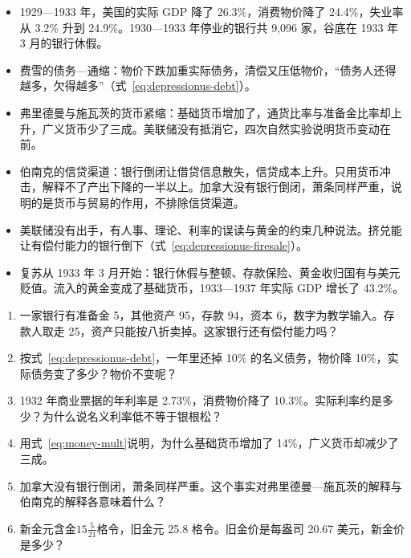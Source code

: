 \begin{takeaways}
\begin{itemize}
\item 1929—1933 年，美国的实际 GDP 降了 26.3\%，消费物价降了 24.4\%，失业率从 3.2\% 升到 24.9\%。1930—1933 年停业的银行共 9,096 家，谷底在 1933 年 3 月的银行休假。
\item 费雪的债务—通缩：物价下跌加重实际债务，清偿又压低物价，“债务人还得越多，欠得越多”（式~\eqref{eq:depressionus-debt}）。
\item 弗里德曼与施瓦茨的货币紧缩：基础货币增加了，通货比率与准备金比率却上升，广义货币少了三成。美联储没有抵消它，四次自然实验说明货币变动在前。
\item 伯南克的信贷渠道：银行倒闭让借贷信息散失，信贷成本上升。只用货币冲击，解释不了产出下降的一半以上。加拿大没有银行倒闭，萧条同样严重，说明的是货币与贸易的作用，不排除信贷渠道。
\item 美联储没有出手，有人事、理论、利率的误读与黄金的约束几种说法。挤兑能让有偿付能力的银行倒下（式~\eqref{eq:depressionus-firesale}）。
\item 复苏从 1933 年 3 月开始：银行休假与整顿、存款保险、黄金收归国有与美元贬值。流入的黄金变成了基础货币，1933—1937 年实际 GDP 增长了 43.2\%。
\end{itemize}
\end{takeaways}

\begin{selfcheck}
\begin{enumerate}
\item 一家银行有准备金 5，其他资产 95，存款 94，资本 6，数字为教学输入。存款人取走 25，资产只能按八折卖掉。这家银行还有偿付能力吗？
\item 按式~\eqref{eq:depressionus-debt}，一年里还掉 10\% 的名义债务，物价降 10\%，实际债务变了多少？物价不变呢？
\item 1932 年商业票据的年利率是 2.73\%，消费物价降了 10.3\%。实际利率约是多少？为什么说名义利率低不等于银根松？
\item 用式~\eqref{eq:money-mult}说明，为什么基础货币增加了 14\%，广义货币却减少了三成。
\item 加拿大没有银行倒闭，萧条同样严重。这个事实对弗里德曼—施瓦茨的解释与伯南克的解释各意味着什么？
\item 新金元含金$15\frac{5}{21}$格令，旧金元 25.8 格令。旧金价是每盎司 20.67 美元，新金价是多少？
\end{enumerate}
\end{selfcheck}

